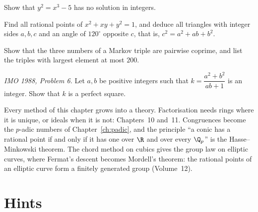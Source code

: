 \begin{exercise}[$\star\star$]\label{ex:mordell5}
Show that $y^2=x^3-5$ has no solution in integers.
\end{exercise}

\begin{exercise}[$\star\star$]\label{ex:eisentri}
Find all rational points of $x^2+xy+y^2=1$, and deduce all triangles with integer sides $a,b,c$ and an angle of $120^\circ$ opposite $c$, that is, $c^2=a^2+ab+b^2$.
\end{exercise}

\begin{exercise}[$\star\star$]\label{ex:markovcoprime}
Show that the three numbers of a Markov triple are pairwise coprime, and list the triples with largest element at most $200$.
\end{exercise}

\begin{exercise}[$\star\star\star$]\label{ex:imo88}
\emph{IMO 1988, Problem 6.} Let $a,b$ be positive integers such that $k=\dfrac{a^2+b^2}{ab+1}$ is an integer. Show that $k$ is a perfect square.
\end{exercise}

\begin{beauty}
Every method of this chapter grows into a theory. Factorisation needs rings where it is unique, or ideals when it is not: Chapters~10 and~11. Congruences become the $p$-adic numbers of Chapter~\ref{ch:padic}, and the principle ``a conic has a rational point if and only if it has one over $\R$ and over every $\Q_p$'' is the Hasse--Minkowski theorem. The chord method on cubics gives the group law on elliptic curves, where Fermat's descent becomes Mordell's theorem: the rational points of an elliptic curve form a finitely generated group (Volume~12).
\end{beauty}

\section{Hints}

